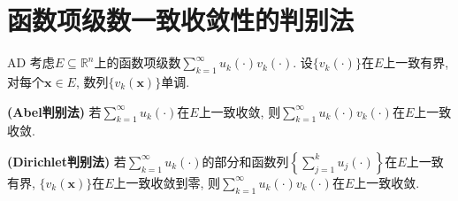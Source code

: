 \section{函数项级数一致收敛性的判别法}
\begin{theorem}{}{AD}
考虑\(E\subseteq\mathbb{R}^n\)上的函数项级数\(\sum_{k=1}^{\infty}u_k(\cdot)v_k(\cdot)\). 设\(\{v_k(\cdot)\}\)在\(E\)上一致有界, 对每个\(\boldsymbol{x}\in E\), 数列\(\{v_k(\boldsymbol{x})\}\)单调.\begin{compactenum}[(i)]
\item \textbf{(Abel判别法)} 若\(\sum_{k=1}^{\infty}u_k(\cdot)\)在\(E\)上一致收敛, 则\(\sum_{k=1}^{\infty}u_k(\cdot)v_k(\cdot)\)在\(E\)上一致收敛.
\item \textbf{(Dirichlet判别法)} 若\(\sum_{k=1}^{\infty}u_k(\cdot)\)的部分和函数列\(\left\lbrace\sum_{j=1}^{k}u_j(\cdot)\right\rbrace\)在\(E\)上一致有界, \(\{v_k(\boldsymbol{x})\}\)在\(E\)上一致收敛到零, 则\(\sum_{k=1}^{\infty}u_k(\cdot)v_k(\cdot)\)在\(E\)上一致收敛.
\end{compactenum}
\end{theorem}
